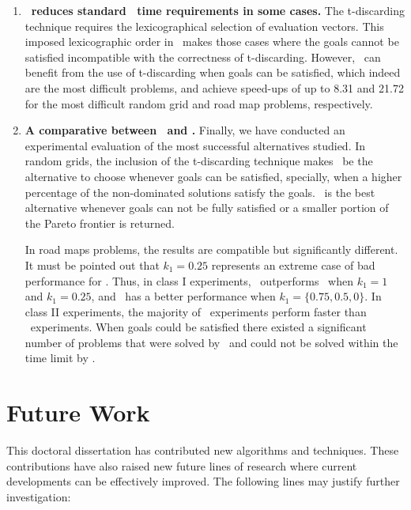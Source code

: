 \begin{enumerate}
    \item \textbf{\lexgote \ reduces standard \lexgo \ time requirements in some cases.} The t-discarding technique requires the lexicographical selection of evaluation vectors. This imposed lexicographic order in \lexgote \ makes those cases where the goals cannot be satisfied incompatible with the correctness of t-discarding. However, \lexgote \ can benefit from the use of t-discarding when goals can be satisfied, which indeed are the most difficult problems, and achieve speed-ups of up to 8.31 and 21.72 for the most difficult random grid and road map problems, respectively. 
    
    \item \textbf{A comparative between \namoate \ and \lexgote.} Finally, we have conducted an experimental evaluation of the most successful alternatives studied. In random grids, the inclusion of the t-discarding technique makes \namoate \ be the alternative to choose whenever goals can be satisfied, specially, when a higher percentage of the non-dominated solutions satisfy the goals. \lexgote \ is the best alternative whenever goals can not be fully satisfied or a smaller portion of the Pareto frontier is returned. 

In road maps problems, the results are compatible but significantly different. It must be pointed out that $k_1 = 0.25$ represents an extreme case of bad performance for \lexgote. Thus, in class I experiments, \namoate \ outperforms \lexgote \ when $k_1 = 1$ and $k_1 = 0.25$, and \lexgote \ has a better performance when $k_1 = \{0.75, 0.5, 0\}$. In class II experiments, the majority of \lexgote \ experiments perform faster than \namoate \ experiments. When goals could be satisfied there existed a significant number of problems that were solved by \namoate \ and could not be solved within the time limit by \lexgote.
      
\end{enumerate}

\section{Future Work}
\label{ChapConclusions:sec:futurework}

This doctoral dissertation has contributed new algorithms and techniques. These contributions have also raised new future lines of research where current developments can be effectively improved. The following lines may justify further investigation: 

